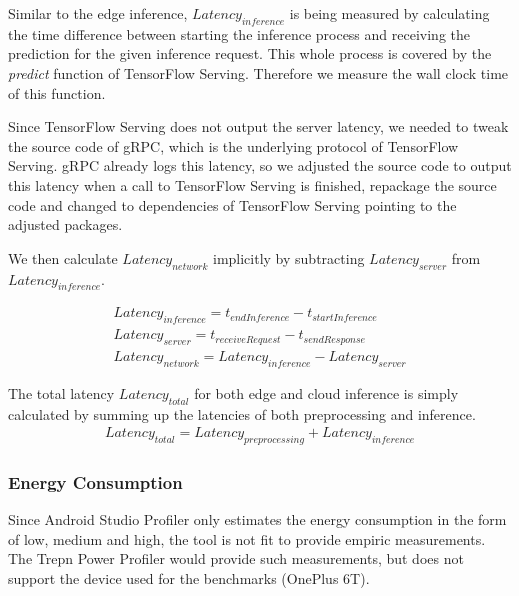 Similar to the edge inference, $Latency_{inference}$ is being measured by calculating the time difference between starting the inference process and receiving the prediction for the given inference request. This whole process is covered by the \emph{predict} function of TensorFlow Serving. Therefore we measure the wall clock time of this function.

Since TensorFlow Serving does not output the server latency, we needed to tweak the source code of gRPC, which is the underlying protocol of TensorFlow Serving. gRPC already logs this latency, so we adjusted the source code to output this latency when a call to TensorFlow Serving is finished, repackage the source code and changed to dependencies of TensorFlow Serving pointing to the adjusted packages.

We then calculate $Latency_{network}$ implicitly by subtracting $Latency_{server}$ from $Latency_{inference}$.

\begin{equation*}
\begin{gathered}
Latency_{inference} = t_{endInference} - t_{startInference}\\
Latency_{server}= t_{receive Request} - t_{send Response}\\
Latency_{network} = Latency_{inference} - Latency_{server}
\end{gathered}
\end{equation*}


The total latency $Latency_{total}$ for both edge and cloud inference is simply calculated by summing up the latencies of both preprocessing and inference.
\begin{equation*}
\begin{gathered}
Latency_{total} = Latency_{preprocessing} + Latency_{inference}
\end{gathered}
\end{equation*}
\subsubsection{Energy Consumption}
Since Android Studio Profiler only estimates the energy consumption in the form of low, medium and high, the tool is not fit to provide empiric measurements. The Trepn Power Profiler would provide such measurements, but does not support the device used for the benchmarks (OnePlus 6T).
